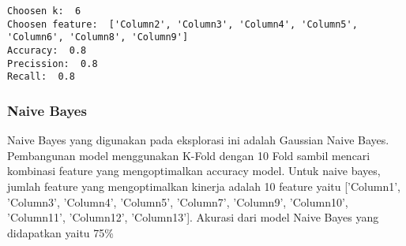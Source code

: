 \documentclass[11pt]{article}
\begin{document}
    \begin{Verbatim}[commandchars=\\\{\}]
Choosen k:  6
Choosen feature:  ['Column2', 'Column3', 'Column4', 'Column5', 'Column6', 'Column8', 'Column9']
Accuracy:  0.8
Precission:  0.8
Recall:  0.8

    \end{Verbatim}

    \subsubsection{Naive Bayes}\label{naive-bayes}

Naive Bayes yang digunakan pada eksplorasi ini adalah Gaussian Naive
Bayes. Pembangunan model menggunakan K-Fold dengan 10 Fold sambil
mencari kombinasi feature yang mengoptimalkan accuracy model. Untuk
naive bayes, jumlah feature yang mengoptimalkan kinerja adalah 10
feature yaitu {[}'Column1', 'Column3', 'Column4', 'Column5', 'Column7',
'Column9', 'Column10', 'Column11', 'Column12', 'Column13'{]}. Akurasi
dari model Naive Bayes yang didapatkan yaitu 75\%
\end{document}
